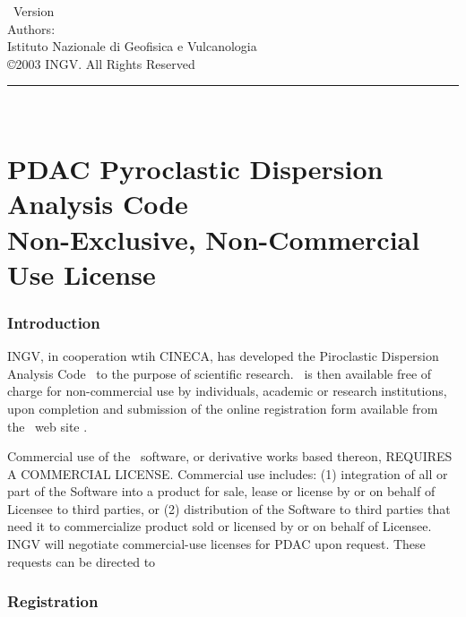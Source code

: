 
\thispagestyle{empty}

\vspace*{0.1in}

\begin{centering}
{\LARGE \PDAC\ Version \PDACVERSION}\\
\bigskip
{\large Authors: \PDACAUTHORS} \\
\medskip
{\large Istituto Nazionale di Geofisica e Vulcanologia } \\
\bigskip
{\large \copyright 2003 INGV.
All Rights Reserved} \\
\bigskip
\end{centering}

  \rule{6in}{0.04in}				\\	\vspace{0.25in}

\section*{PDAC Pyroclastic Dispersion Analysis Code \\
Non-Exclusive, Non-Commercial Use License}

\subsubsection*{Introduction}

INGV, in cooperation wtih CINECA,
has developed the Piroclastic Dispersion Analysis Code \PDAC\
to the purpose of scientific research.
\PDAC\ is then available free of charge for
non-commercial use by individuals, academic or research institutions,
upon completion and submission of the online registration form available 
from the \PDAC\ web site \PDACURL.

Commercial use of the \PDAC\ software, or derivative works based thereon,
REQUIRES A COMMERCIAL LICENSE. Commercial use includes: 
(1) integration of all or part of the Software into a product for sale, 
lease or license by or on behalf of Licensee to third parties, or 
(2) distribution of the Software to third parties that need it to 
commercialize product sold or licensed by or on behalf of Licensee.  
INGV will negotiate commercial-use licenses for PDAC upon request. 
These requests can be directed to \PDACADDRESS

\subsubsection*{Registration}


